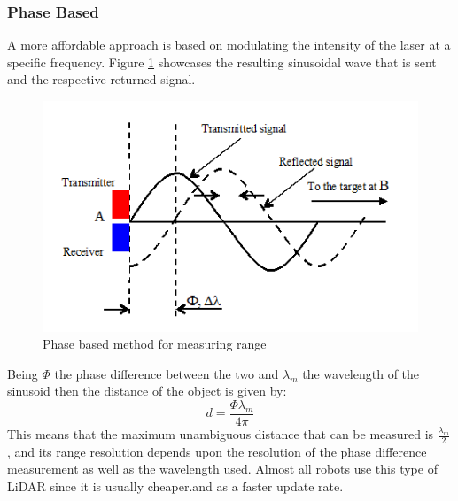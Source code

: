 \subsubsection{Phase Based}
A more affordable approach  is based on modulating the intensity of the laser at a specific frequency. Figure \ref{fig:cwlidar1} showcases the resulting sinusoidal wave that is sent and the respective returned signal. 
\begin{figure}[ht!] 
\centerline{\includegraphics [width=0.7 \textwidth]{imgs/chapter2/cwlidar1.png}}
\caption[Phase based method for measuring range]{Phase based method for measuring range \cite{cwlidar}}
\label{fig:cwlidar1}
\end{figure}

Being $\Phi$ the phase difference between the two and $\lambda_m$ the wavelength of the sinusoid then the distance of the object is given by:
\begin{equation}
    d=\frac{\Phi \lambda_m}{4 \pi}
\end{equation}
This means that the maximum unambiguous distance that can be measured is  $\frac{\lambda_m}{2}$, and its range resolution depends upon the resolution of the phase difference measurement as well as the wavelength used. Almost all robots use this type of \ac{LiDAR} since it is usually cheaper.and as a faster update rate.


